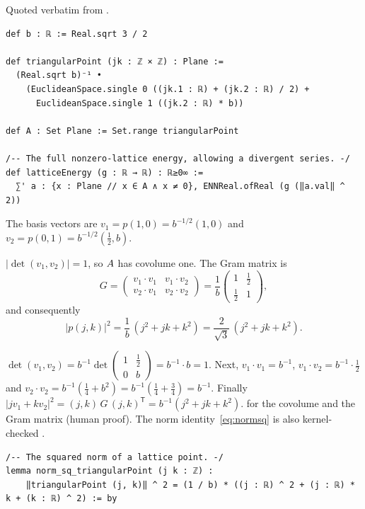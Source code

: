 \begin{leanbox}
Quoted verbatim from .
\begin{lstlisting}[language=Lean]
def b : ℝ := Real.sqrt 3 / 2

def triangularPoint (jk : ℤ × ℤ) : Plane :=
  (Real.sqrt b)⁻¹ •
    (EuclideanSpace.single 0 ((jk.1 : ℝ) + (jk.2 : ℝ) / 2) +
      EuclideanSpace.single 1 ((jk.2 : ℝ) * b))

def A : Set Plane := Set.range triangularPoint

/-- The full nonzero-lattice energy, allowing a divergent series. -/
def latticeEnergy (g : ℝ → ℝ) : ℝ≥0∞ :=
  ∑' a : {x : Plane // x ∈ A ∧ x ≠ 0}, ENNReal.ofReal (g (‖a.val‖ ^ 2))
\end{lstlisting}
\end{leanbox}

The basis vectors are $v_1=p(1,0)=b^{-1/2}(1,0)$ and $v_2=p(0,1)=b^{-1/2}(\tfrac12,b)$.

\begin{proposition}\label{prop:gram}
$|\det(v_1,v_2)|=1$, so $A$ has covolume one. The Gram matrix is
\[
  G=\begin{pmatrix} v_1\cdot v_1 & v_1\cdot v_2\\ v_2\cdot v_1 & v_2\cdot v_2\end{pmatrix}
   =\frac1b\begin{pmatrix}1&\tfrac12\\ \tfrac12&1\end{pmatrix},
\]
and consequently
\begin{equation}\label{eq:normsq}
  |p(j,k)|^2=\frac1b\,(j^2+jk+k^2)=\frac{2}{\sqrt3}\,(j^2+jk+k^2).
\end{equation}
\end{proposition}
\begin{humanproof}
$\det(v_1,v_2)=b^{-1}\det\begin{pmatrix}1&\tfrac12\\0&b\end{pmatrix}=b^{-1}\cdot b=1$. Next,
$v_1\cdot v_1=b^{-1}$, $v_1\cdot v_2=b^{-1}\cdot\tfrac12$ and $v_2\cdot v_2=b^{-1}(\tfrac14+b^2)=b^{-1}(\tfrac14+\tfrac34)=b^{-1}$.
Finally $|jv_1+kv_2|^2=(j,k)\,G\,(j,k)^{\mathsf T}=b^{-1}(j^2+jk+k^2)$. \tierC{} for the covolume and the Gram
matrix (human proof). The norm identity~\eqref{eq:normsq} is also kernel-checked \tierA{}.
\end{humanproof}

\begin{leanbox}
\begin{lstlisting}[language=Lean]
/-- The squared norm of a lattice point. -/
lemma norm_sq_triangularPoint (j k : ℤ) :
    ‖triangularPoint (j, k)‖ ^ 2 = (1 / b) * ((j : ℝ) ^ 2 + (j : ℝ) * k + (k : ℝ) ^ 2) := by
\end{lstlisting}
\end{leanbox}

